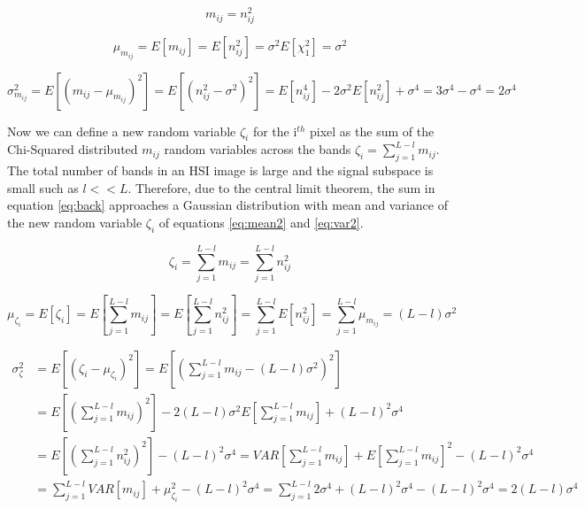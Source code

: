 \documentclass[paper=a4, fontsize=11pt]{article} %
\begin{document}
\begin{equation}
m_{ij} = n_{ij}^2
\end{equation}

\begin{equation}
\label{eq:mean}
\mu_{m_{ij}} = E\left[m_{ij}\right] = E\left[n_{ij}^2\right] = \sigma^2 E\left[\chi_1^2\right] = \sigma^2
\end{equation}

\begin{equation}
\label{eq:variance}
\sigma_{m_{ij}}^2 = E\left[\left(m_{ij} - \mu_{m_{ij}}\right)^2\right] = E\left[\left(n_{ij}^2-\sigma^2\right)^2\right] = E\left[n_{ij}^4\right] - 2\sigma^2 E\left[n_{ij}^2\right] + \sigma^4 = 3\sigma^4 - \sigma^4 = 2\sigma^4
\end{equation}

Now we can define a new random variable \(\zeta_i\) for the i\(^{th}\) pixel as the sum of the Chi-Squared distributed \(m_{ij}\) random variables across the bands \(\zeta_i = \sum_{j=1}^{L-l}m_{ij}\). The total number of bands in an HSI image is large and the signal subspace is small such as \(l<<L\). Therefore, due to the central limit theorem, the sum in equation \ref{eq:back} approaches a Gaussian distribution with mean and variance of the new random variable \(\zeta_i\) of equations \ref{eq:mean2} and \ref{eq:var2}.

\begin{equation}
\zeta_i = \sum_{j=1}^{L-l}m_{ij} = \sum_{j=1}^{L-l}n_{ij}^2
\end{equation}

\begin{equation}
\label{eq:mean2}
\mu_{\zeta_i} = E\left[\zeta_i\right] = E\left[\sum_{j=1}^{L-l}m_{ij}\right] = E\left[\sum_{j=1}^{L-l}n_{ij}^2\right] = \sum_{j=1}^{L-l}E\left[n_{ij}^2\right] = \sum_{j=1}^{L-l}\mu_{m_{ij}} = (L-l)\sigma^2
\end{equation}

\begin{align}
\label{eq:var2}
\sigma_\zeta^2 &= E\left[\left(\zeta_i-\mu_{\zeta_i}\right)^2\right] = E\left[\left(\sum_{j=1}^{L-l}m_{ij} - (L-l)\sigma^2\right)^2\right] \\
&= E\left[\left(\sum_{j=1}^{L-l}m_{ij}\right)^2\right] - 2(L-l)\sigma^2E\left[\sum_{j=1}^{L-l}m_{ij}\right] + (L-l)^2\sigma^4 \\
&= E\left[\left(\sum_{j=1}^{L-l}n_{ij}^2\right)^2\right] - (L-l)^2\sigma^4 = VAR\left[\sum_{j=1}^{L-l}m_{ij}\right]+E\left[\sum_{j=1}^{L-l}m_{ij}\right]^2 -(L-l)^2\sigma^4 \\
&= \sum_{j=1}^{L-l}VAR\left[m_{ij}\right] + \mu_{\zeta_i}^2 - (L-l)^2\sigma^4 = \sum_{j=1}^{L-l}2\sigma^4 +(L-l)^2\sigma^4-(L-l)^2\sigma^4 = 2(L-l)\sigma^4
\end{align}
\end{document}
